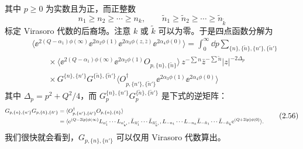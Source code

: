 
其中 $p\ge 0$ 为实数且为正，而正整数
\begin{equation}
  n_1\ge n_2\ge\cdots\ge n_k,\qquad
  \tilde n_1\ge\tilde n_2\ge\cdots\ge\tilde n_{\tilde k}
  \tag{2.54}
\end{equation}
标定 Virasoro 代数的后裔场。注意 $k$ 或 $\tilde k$ 可以为零。于是四点函数分解为
\begin{equation}
  \begin{aligned}
    &\langle \ee^{2(Q-\alpha_1)\phi(\infty)}\ee^{2\alpha_2\phi(1)}
      \ee^{2\alpha_3\phi(z,\bar z)}\ee^{2\alpha_4\phi(0)}\rangle
      = \int_0^\infty \dd p \!\!\sum_{\{n\},\{\tilde n\},\{n'\},\{\tilde n'\}} \\
    &\qquad \times \langle \ee^{2(Q-\alpha_1)\phi(\infty)}\ee^{2\alpha_2\phi(1)}
      O_{p,\{n\},\{\tilde n\}}\rangle\,
      z^{-\sum n}\bar z^{-\sum\tilde n}|z|^{-2\Delta_p} \\
    &\qquad \times G^{\{n\},\{n'\}}G^{\{\tilde n\},\{\tilde n'\}}
      \langle O_{p,\{n'\},\{\tilde n'\}}^{\dagger}\ee^{2\alpha_3\phi(1)}
      \ee^{2\alpha_4\phi(0)}\rangle
  \end{aligned}
  \tag{2.55}
\end{equation}
其中 $\Delta_p=p^2+Q^2/4$，而 $G^{\{n\},\{n'\}}_pG^{\{\tilde n\},\{\tilde n'\}}_p$ 是下式的逆矩阵：
\begin{equation}
  \resizebox{0.985\textwidth}{!}{$\displaystyle
  \begin{aligned}
    G_{p,\{n\},\{n'\}}G_{p,\{\tilde n\},\{\tilde n'\}}
    &= \langle O_{p,\{n'\},\{\tilde n'\}}^{\dagger}O_{p,\{n\},\{\tilde n\}}\rangle \\
    &= \langle \ee^{(Q-2\ii p)\phi(\infty)}L_{n'_1}\cdots L_{n'_{k'}},
      \bar L_{\tilde n'_1}\cdots \bar L_{\tilde n'_{\tilde k'}},
      L_{-n_1}\cdots L_{-n_k}\bar L_{-\tilde n_1}\cdots \bar L_{-\tilde n_{\tilde k}}
      \ee^{(Q+2\ii p)\phi(0)}\rangle .
  \end{aligned}$}
  \tag{2.56}
\end{equation}
我们很快就会看到，$G_{p,\{n\},\{n'\}}$ 可以仅用 Virasoro 代数算出。

